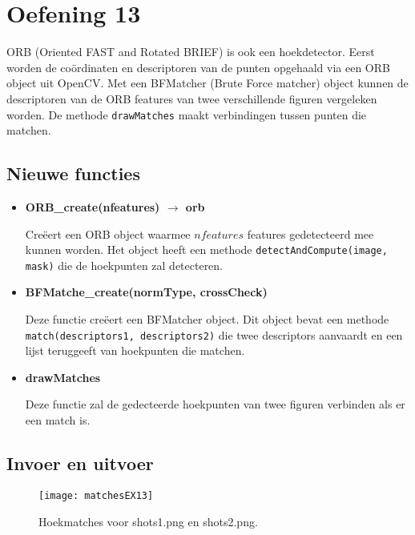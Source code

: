 \documentclass{article}
\begin{document}
	\section*{Oefening 13}
	ORB (Oriented FAST and Rotated BRIEF) is ook een hoekdetector. Eerst worden de coördinaten en descriptoren van de punten opgehaald via een ORB object uit OpenCV. Met een BFMatcher (Brute Force matcher) object kunnen de descriptoren van de ORB features van twee verschillende figuren vergeleken worden. De methode \texttt{drawMatches} maakt verbindingen tussen punten die matchen. 
	\subsection*{Nieuwe functies}
	\begin{itemize}		
		\item \textbf{ORB\_create(nfeatures) $\rightarrow$ orb}
		
		Creëert een ORB object waarmee $nfeatures$ features gedetecteerd mee kunnen worden. Het object heeft een methode \texttt{detectAndCompute(image, mask)} die de hoekpunten zal detecteren.
		\item \textbf{BFMatche\_create(normType, crossCheck)}
		
		Deze functie creëert een BFMatcher object. Dit object bevat een methode \texttt{match(descriptors1, descriptors2)} die twee descriptors aanvaardt en een lijst teruggeeft van hoekpunten die matchen.
		
		\item \textbf{drawMatches}
		
		Deze functie zal de gedecteerde hoekpunten van twee figuren verbinden als er een match is.
	\end{itemize}
	\subsection*{Invoer en uitvoer}
	\begin{figure}[!htb]
			\centering
			\texttt{[image: matchesEX13]}
			\caption{Hoekmatches voor shots1.png en shots2.png.}
	\end{figure}

	
\end{document}
